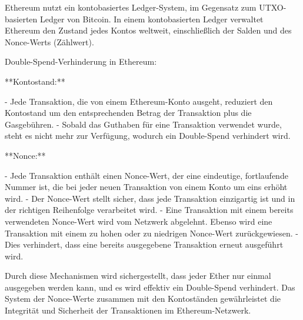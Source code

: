\documentclass[german]{../uebung}
\begin{document}
\begin{exercise}{3}
    Ethereum nutzt ein kontobasiertes Ledger-System, im Gegensatz zum UTXO-basierten Ledger von Bitcoin. In einem kontobasierten Ledger verwaltet Ethereum den Zustand jedes Kontos weltweit, einschließlich der Salden und des Nonce-Werts (Zählwert).

    Double-Spend-Verhinderung in Ethereum:

    **Kontostand:**

    - Jede Transaktion, die von einem Ethereum-Konto ausgeht, reduziert den Kontostand um den entsprechenden Betrag der Transaktion plus die Gasgebühren.
    - Sobald das Guthaben für eine Transaktion verwendet wurde, steht es nicht mehr zur Verfügung, wodurch ein Double-Spend verhindert wird.

    **Nonce:**

    - Jede Transaktion enthält einen Nonce-Wert, der eine eindeutige, fortlaufende Nummer ist, die bei jeder neuen Transaktion von einem Konto um eins erhöht wird.
    - Der Nonce-Wert stellt sicher, dass jede Transaktion einzigartig ist und in der richtigen Reihenfolge verarbeitet wird.
    - Eine Transaktion mit einem bereits verwendeten Nonce-Wert wird vom Netzwerk abgelehnt. Ebenso wird eine Transaktion mit einem zu hohen oder zu niedrigen Nonce-Wert zurückgewiesen.
    - Dies verhindert, dass eine bereits ausgegebene Transaktion erneut ausgeführt wird.

    Durch diese Mechanismen wird sichergestellt, dass jeder Ether nur einmal ausgegeben werden kann, und es wird effektiv ein Double-Spend verhindert. Das System der Nonce-Werte zusammen mit den Kontoständen gewährleistet die Integrität und Sicherheit der Transaktionen im Ethereum-Netzwerk.
\end{exercise}
\end{document}
